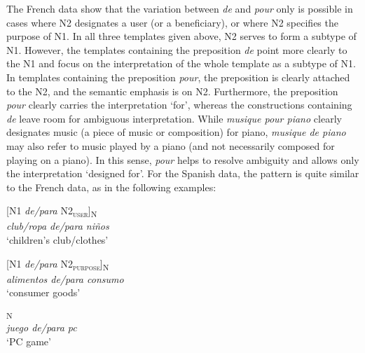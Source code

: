 \documentclass[output=paper]{langsci/langscibook}
\begin{document}
The French data show that the variation between \textit{de} and \textit{pour} only is possible in cases where N2 designates a user (or a beneficiary), or where N2 specifies the purpose of N1. In all three templates given above, N2 serves to form a subtype of N1. However, the templates containing the preposition \textit{de} point more clearly to the N1 and focus on the interpretation of the whole template as a subtype of N1. In templates containing the preposition \textit{pour}, the preposition is clearly attached to the N2, and the semantic emphasis is on N2. Furthermore, the preposition \textit{pour} clearly carries the interpretation `for', whereas the constructions containing \textit{de} leave room for ambiguous interpretation. While \textit{musique pour piano} clearly designates music (a piece of music or composition) for piano, \textit{musique de piano} may also refer to music played by a piano (and not necessarily composed for playing on a piano). In this sense, \textit{pour} helps to resolve ambiguity and allows only the interpretation `designed for'. For the Spanish data, the pattern is quite similar to the French data, as in the following examples: 

\begin{exe}\ex\begin{minipage}[t]{0.4\textwidth}  
[N1 \textit{de/para} N2\textsubscript{\scshape user}]\textsubscript{N}\\
\textit{club/ropa de/para niños }\\
`children’s club/clothes'
\end{minipage}\hfill
\begin{minipage}[t]{0.45\textwidth}
[N1 \textit{de/para} N2\textsubscript{\scshape purpose}]\textsubscript{N}\\
\textit{alimentos de/para consumo}\\
`consumer goods'
\end{minipage}\end{exe}

\ea{}\textsubscript{N}\\
\textit{juego de/para pc}\\
`PC game'
\z
\end{document}
